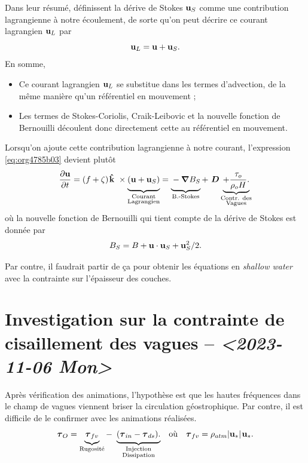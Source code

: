 \documentclass[10pt]{article}
\numberwithin{equation}{section}
\newcommand{\kvf}{\vb{\hat{k}}}
\newcommand{\uu}{\vb{u}}
\newcommand{\tall}{\vphantom{pA^{x^x}_p}}
\newcommand{\grande}{\vphantom{\frac{1}{xx}}}
\newcommand{\pt}{\hspace{1pt}} %
\begin{document}
Dans leur résumé, \Textcite{suzuki2016understanding}  définissent la dérive de Stokes \(\uu_S\) comme une contribution lagrangienne à notre écoulement, de sorte qu'on peut décrire ce courant lagrangien \(\uu_L\) par
\begin{equation}
   \uu_L = \uu + \uu_S.
\end{equation}
En somme, 
\begin{itemize}
\item Ce courant lagrangien \(\uu_L\) se substitue dans les termes d'advection, de la même manière qu'un référentiel en mouvement ;
\item Les termes de Stokes-Coriolis, Craik-Leibovic et la nouvelle fonction de Bernouilli découlent donc directement cette au référentiel en mouvement. \bigskip
\end{itemize}

Lorsqu'on ajoute cette contribution lagrangienne à notre courant, l'expression \ref{eq:org4785b03} devient plutôt
\begin{equation}
   \pdv{\uu}{t} = \qty(f+\zeta)\pt \kvf\ \times\underbrace{\grande\qty(\uu + \uu_S)}_{\substack{\text{Courant} \\ \text{Lagrangien}}} = \underbrace{\grande-\gradient{B_S}}_\text{B.-Stokes} + \ \boldsymbol{D} \underbrace{+ \frac{\tau_o}{\rho_o H}.}_{\substack{\text{Contr. des} \\ \text{Vagues}}}
\end{equation}
où la nouvelle fonction de Bernouilli qui tient compte de la dérive de Stokes est donnée par
\begin{align}
   B_S = B + \uu\cdot\uu_S + \uu_S^2/2.
\end{align}

Par contre, il faudrait partir de ça pour obtenir les équations en \emph{shallow water} avec la contrainte sur l'épaisseur des couches.
\section{Investigation sur la contrainte de cisaillement des vagues -- \textit{<2023-11-06 Mon>}}
\label{sec:org9bd18e1}

Après vérification des animations, l'hypothèse est que les hautes fréquences dans le champ de vagues viennent briser la circulation géostrophique.
Par contre, il est difficile de le confirmer avec les animations réalisées.
\begin{align}
\label{eq:org07c64c7}
   && \boldsymbol{\tau}_{O} = \underbrace{\tall\boldsymbol{\tau}_{fv}}_\text{Rugosité}  - \ \underbrace{(\tall\boldsymbol{\tau}_{in} - \boldsymbol{\tau}_{ds}).}_{\substack{\text{Injection} \\ \text{Dissipation}}}
   && \text{où}
   && \boldsymbol{\tau}_{fv} = \rho_{atm} \abs{\uu_*}\pt\uu_*. &&
\end{align}
\end{document}
